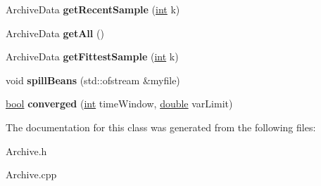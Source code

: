 \begin{DoxyCompactItemize}
\item 
Archive\+Data {\bfseries get\+Recent\+Sample} (\hyperlink{classint}{int} k)\hypertarget{classSubArchive_a0e0ae1459251f70b47bf17e687805e33}{}\label{classSubArchive_a0e0ae1459251f70b47bf17e687805e33}

\item 
Archive\+Data {\bfseries get\+All} ()\hypertarget{classSubArchive_a27c753fc7ed47dded5bc86e037bed138}{}\label{classSubArchive_a27c753fc7ed47dded5bc86e037bed138}

\item 
Archive\+Data {\bfseries get\+Fittest\+Sample} (\hyperlink{classint}{int} k)\hypertarget{classSubArchive_a7f033f1f2341a523c354178d7e987b63}{}\label{classSubArchive_a7f033f1f2341a523c354178d7e987b63}

\item 
void {\bfseries spill\+Beans} (std\+::ofstream \&myfile)\hypertarget{classSubArchive_ae9bae4804791594d039f8cc8ca0890e5}{}\label{classSubArchive_ae9bae4804791594d039f8cc8ca0890e5}

\item 
\hyperlink{classbool}{bool} {\bfseries converged} (\hyperlink{classint}{int} time\+Window, \hyperlink{classdouble}{double} var\+Limit)\hypertarget{classSubArchive_a4a7025004dbfb8679cfb19c3832283dc}{}\label{classSubArchive_a4a7025004dbfb8679cfb19c3832283dc}

\end{DoxyCompactItemize}


The documentation for this class was generated from the following files\+:\begin{DoxyCompactItemize}
\item 
Archive.\+h\item 
Archive.\+cpp\end{DoxyCompactItemize}
